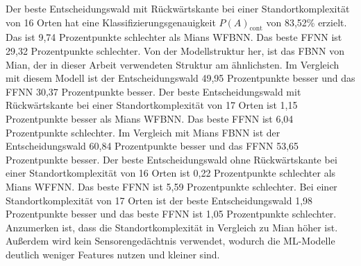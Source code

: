 Der beste Entscheidungswald mit Rückwärtskante bei einer Standortkomplexität von 16 Orten hat eine Klassifizierungsgenauigkeit $P(A)_{\text{cont}}$ von 83,52\% erzielt.
Das ist 9,74 Prozentpunkte schlechter als Mians WFBNN.
Das beste FFNN ist 29,32 Prozentpunkte schlechter.
Von der Modellstruktur her, ist das FBNN von Mian, der in dieser Arbeit verwendeten Struktur am ähnlichsten.
Im Vergleich mit diesem Modell ist der Entscheidungswald 49,95 Prozentpunkte besser und das FFNN 30,37 Prozentpunkte besser.
\newline
\newline
Der beste Entscheidungswald mit Rückwärtskante bei einer Standortkomplexität von 17 Orten ist 1,15 Prozentpunkte besser als Mians WFBNN.
Das beste FFNN ist 6,04 Prozentpunkte schlechter.
Im Vergleich mit Mians FBNN ist der Entscheidungswald 60,84 Prozentpunkte besser und das FFNN 53,65 Prozentpunkte besser.
\newline
\newline
Der beste Entscheidungswald ohne Rückwärtskante bei einer Standortkomplexität von 16 Orten ist 0,22 Prozentpunkte schlechter als Mians WFFNN.
Das beste FFNN ist 5,59 Prozentpunkte schlechter.
Bei einer Standortkomplexität von 17 Orten ist der beste Entscheidungswald 1,98 Prozentpunkte besser und das beste FFNN ist 1,05 Prozentpunkte schlechter.
Anzumerken ist, dass die Standortkomplexität in Vergleich zu Mian höher ist.
Außerdem wird kein Sensorengedächtnis verwendet, wodurch die ML-Modelle deutlich weniger Features nutzen und kleiner sind.

